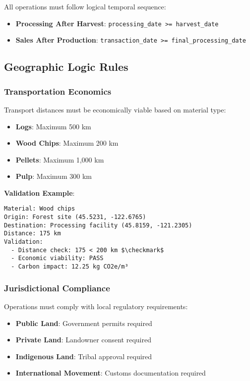 All operations must follow logical temporal sequence:

\begin{itemize}
    \item \textbf{Processing After Harvest}: \texttt{processing\_date >= harvest\_date}
    \item \textbf{Sales After Production}: \texttt{transaction\_date >= final\_processing\_date}
\end{itemize}

\subsection{Geographic Logic Rules}
\label{sec:geographic-logic}

\subsubsection{Transportation Economics}

Transport distances must be economically viable based on material type:

\begin{itemize}
    \item \textbf{Logs}: Maximum 500 km
    \item \textbf{Wood Chips}: Maximum 200 km  
    \item \textbf{Pellets}: Maximum 1,000 km
    \item \textbf{Pulp}: Maximum 300 km
\end{itemize}

\textbf{Validation Example}:
\begin{verbatim}
Material: Wood chips
Origin: Forest site (45.5231, -122.6765)
Destination: Processing facility (45.8159, -121.2305)
Distance: 175 km
Validation:
  - Distance check: 175 < 200 km $\checkmark$
  - Economic viability: PASS
  - Carbon impact: 12.25 kg CO2e/m³
\end{verbatim}

\subsubsection{Jurisdictional Compliance}

Operations must comply with local regulatory requirements:

\begin{itemize}
    \item \textbf{Public Land}: Government permits required
    \item \textbf{Private Land}: Landowner consent required
    \item \textbf{Indigenous Land}: Tribal approval required
    \item \textbf{International Movement}: Customs documentation required
\end{itemize}

